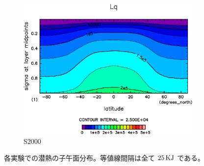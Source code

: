 \documentclass[body]{subfiles}
\begin{document}
\begin{figure}[t]
\begin{subfigure}{.4\textwidth}
		\includegraphics[width=\columnwidth]{S2000/Lq,time=7300:7665-crop-rotate.pdf}
		\caption{S2000}\label{LqS2000}
	\end{subfigure}
	\caption[各実験での潜熱の子午面分布]{
		各実験での潜熱の子午面分布。等値線間隔は全て \(25\hmu{KJ}\) である。
	}\label{Lq}
\end{figure}
\end{document}
